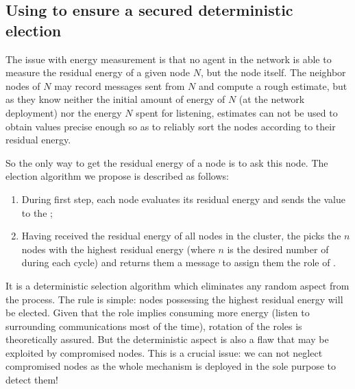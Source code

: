 
    \subsection{Using \vns to ensure a secured deterministic election}
        \label{se:subsubsec:elec1}

The issue with energy measurement is that no agent in the network is able to measure the residual energy of a given node $N$, but the node itself.
The neighbor nodes of $N$ may record messages sent from $N$ and compute a rough estimate, but as they know neither the initial amount of energy of $N$ (at the network deployment) nor the energy $N$ spent for listening, estimates can not be used to obtain values precise enough so as to reliably sort the nodes according to their residual energy.

So the only way to get the residual energy of a node is to ask this node.
The election algorithm we propose is described as follows:
\begin{enumerate}
    \item During first step, each node evaluates its residual energy and sends the value to the \ch;
    \item Having received the residual energy of all nodes in the cluster, the \ch picks the $n$ nodes with the highest residual energy (where $n$ is the desired number of \cns during each cycle) and returns them a message to assign them the role of \cn.
\end{enumerate}
It is a deterministic selection algorithm which eliminates any random aspect from the process.
The rule is simple: nodes possessing the highest residual energy will be elected.
Given that the \cn role implies consuming more energy (\cns listen to surrounding communications most of the time), rotation of the roles is theoretically assured.
But the deterministic aspect is also a flaw that may be exploited by compromised nodes.
This is a crucial issue: we can not neglect compromised nodes as the whole \cns mechanism is deployed in the sole purpose to detect them!

